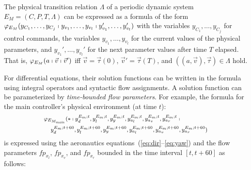 \documentclass{sig-alternate}
\begin{document}
The physical transition relation $\Lambda$ 
of a periodic dynamic system
$E_M = (C, P, T, \Lambda)$
can be expressed as a formula
of the form
$\varphi_{E_M}(
y_{C_1},\ldots,y_{C_j}\shortmid
y_{v_1}, \ldots, y_{v_l}\shortmid
y_{v_1}', \ldots, y_{v_l}')
$
with
the variables $y_{C_1},\ldots,y_{C_j}$  for control commands,
the variables  $y_{v_1}, \ldots, y_{v_l}$  for the current values of the physical parameters,
and 
$y_{v_1}', \ldots, y_{v_l}'$ for the next parameter values after time $T$ elapsed.
That is,
$\varphi_{E_M}(a\shortmid \vec{v}\shortmid \vec{v}')$
iff
$\vec{v} = \vec{\tau}(0)$, 
$\vec{v}' = \vec{\tau}(T)$, and 
$((a, \vec{v}),  \vec{\tau}) \in \Lambda$ hold.

For differential equations,
their solution functions can be written in the formula 
using integral operators and syntactic flow assignments.
A solution function can be parameterized by
\emph{time-bounded flow parameters}.
%
For example, the formula for the main controller's physical environment
 (at time $t$): 
\[
\begin{medsize}
\begin{aligned}
	\begin{multlined}
	\varphi_{E_{M_\mathit{main}}}(\ast  \shortmid
		 y_d^{E_m;t},  y_l^{E_m;t}, y_y^{E_m;t}, y_{a_l}^{E_m;t}, y_{a_v}^{E_m;t}, y_{a_r}^{E_m;t}  \shortmid  \\
		 y_d^{E_m;t+60},  y_l^{E_m;t+60}, y_y^{E_m;t+60}, y_{a_l}^{E_m;t+60}, y_{a_v}^{E_m;t+60}, y_{a_r}^{E_m;t+60} )
	\end{multlined}
\end{aligned}
\end{medsize}
\]
is expressed
using the aeronautics equations~(\ref{eq:dir}--\ref{eq:yaw})
and the flow parameters $\mathit{fp}_{x_l}$,
$\mathit{fp}_{x_v}$, and $\mathit{fp}_{x_r}$
bounded in the time interval $[t, t+60]$ as follows:
\end{document}
